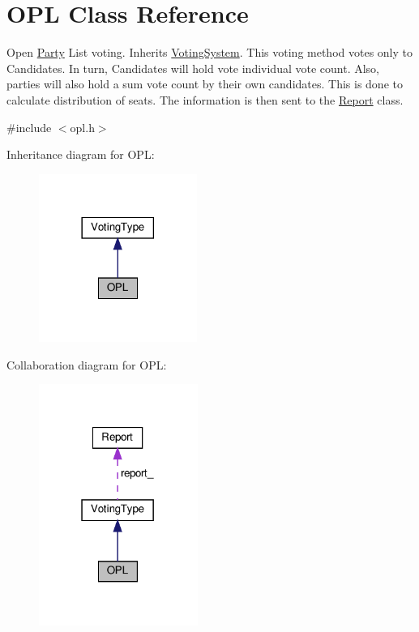 \hypertarget{classOPL}{}\section{O\+PL Class Reference}
\label{classOPL}


Open \hyperlink{classParty}{Party} List voting. Inherits \hyperlink{classVotingSystem}{Voting\+System}. This voting method votes only to Candidates. In turn, Candidates will hold vote individual vote count. Also, parties will also hold a sum vote count by their own candidates. This is done to calculate distribution of seats. The information is then sent to the \hyperlink{classReport}{Report} class.  




{\ttfamily \#include $<$opl.\+h$>$}



Inheritance diagram for O\+PL\+:
\nopagebreak
\begin{figure}[H]
\begin{center}
\leavevmode
\includegraphics[width=146pt]{classOPL__inherit__graph}
\end{center}
\end{figure}


Collaboration diagram for O\+PL\+:
\nopagebreak
\begin{figure}[H]
\begin{center}
\leavevmode
\includegraphics[width=147pt]{classOPL__coll__graph}
\end{center}
\end{figure}
